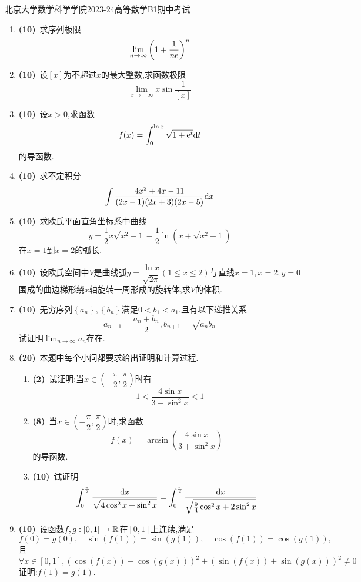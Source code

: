 \documentclass{ctexart}
\begin{document}
\pagestyle{empty}
\begin{center}\Large
    北京大学数学科学学院2023-24高等数学B1期中考试
\end{center}
\begin{enumerate}[leftmargin=*,label=\textbf{\arabic*.},topsep=0pt,parsep=0pt,itemsep=0pt,partopsep=0pt]
    \item \textbf{(10)}\ 求序列极限$$\lim_{n\to\infty}{\left(1+\dfrac{1}{n\mathrm{e}}\right)^n}$$

    \item \textbf{(10)}\ 设$[x]$为不超过$x$的最大整数,求函数极限$$\lim_{x\to+\infty}{x\sin{\dfrac{1}{[x]}}}$$

    \item \textbf{(10)}\ 设$x>0$,求函数$$f(x)=\int_{0}^{\ln{x}}{\sqrt{1+\mathrm{e}^t}\mathrm{d} t}$$的导函数.

    \item \textbf{(10)}\ 求不定积分$$\int{\dfrac{4x^2+4x-11}{(2x-1)(2x+3)(2x-5)}\mathrm{d}x}$$

    \item \textbf{(10)}\ 求欧氏平面直角坐标系中曲线$$y=\dfrac{1}{2}x\sqrt{x^2-1}-\dfrac{1}{2}\ln{\left(x+\sqrt{x^2-1}\right)}$$在$x=1$到$x=2$的弧长.

    \item \textbf{(10)}\ 设欧氏空间中$V$是曲线弧$\displaystyle y=\dfrac{\ln{x}}{\sqrt{2\pi}}(1\leqslant x\leqslant 2)$与直线$x=1,x=2,y=0$围成的曲边梯形绕$x$轴旋转一周形成的旋转体,求$V$的体积.

    \item \textbf{(10)}\ 无穷序列$\left\{a_n\right\},\left\{b_n\right\}$满足$0<b_1<a_1$,且有以下递推关系$$a_{n+1}=\dfrac{a_n+b_n}{2},b_{n+1}=\sqrt{a_nb_n}$$试证明$\displaystyle\lim_{n\to\infty}{a_n}$存在.

    \item \textbf{(20)}\ 本题中每个小问都要求给出证明和计算过程.
        \begin{enumerate}[label=\textbf{(\arabic*)}]
            \item \textbf{(2)}\ 试证明:当$x\in\left(-\dfrac{\pi}{2},\dfrac{\pi}{2}\right)$时有$$-1<\dfrac{4\sin{x}}{3+\sin^2{x}}<1$$
            \item \textbf{(8)}\ 当$x\in\left(-\dfrac{\pi}{2},\dfrac{\pi}{2}\right)$时,求函数$$f(x)=\arcsin{\left(\dfrac{4\sin{x}}{3+\sin^2{x}}\right)}$$的导函数.
            \item \textbf{(10)}\ 试证明$$\int_{0}^{\frac{\pi}{2}}{\dfrac{\mathrm{d} x}{\sqrt{4\cos^2{x}+\sin^2{x}}}}=\int_{0}^{\frac{\pi}{2}}{\dfrac{\mathrm{d} x}{\sqrt{\frac{9}{4}\cos^2{x}+2\sin^2{x}}}}$$
        \end{enumerate}

    \item \textbf{(10)}\ 设函数$f,g:[0,1]\to\mathbb{R}$在$[0,1]$上连续,满足
    \[f(0)=g(0),\quad\sin(f(1))=\sin(g(1)),\quad\cos(f(1))=\cos(g(1)),\]
    且
    $$\forall x\in[0,1],\left(\cos(f(x))+\cos(g(x))\right)^2+\left(\sin(f(x))+\sin(g(x))\right)^2\neq 0$$
    证明:$f(1)=g(1)$.
\end{enumerate}
\end{document}
